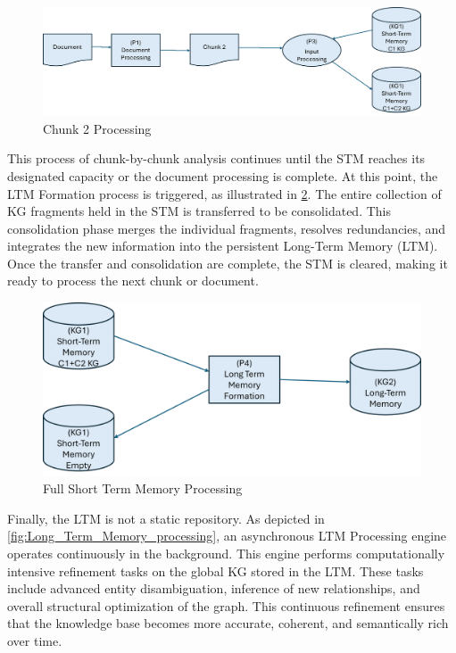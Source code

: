 \begin{figure}[htp]
    \centering
    \includegraphics[width=\linewidth]{figures/chap3_fig/Chunk 2 Processing.png}
    \caption{Chunk 2 Processing}
    \label{fig:chunk_2_processing}
\end{figure}

This process of chunk-by-chunk analysis continues until the STM reaches its designated capacity or the document processing is complete. At this point, the LTM Formation process is triggered, as illustrated in \cref{fig:Full_STM_processing}. The entire collection of KG fragments held in the STM is transferred to be consolidated. This consolidation phase merges the individual fragments, resolves redundancies, and integrates the new information into the persistent Long-Term Memory (LTM). Once the transfer and consolidation are complete, the STM is cleared, making it ready to process the next chunk or document.

\begin{figure}[htp]
    \centering
    \includegraphics[width=\linewidth]{figures/chap3_fig/Full Short Term Memory.png}
    \caption{Full Short Term Memory Processing}
    \label{fig:Full_STM_processing}
\end{figure}

Finally, the LTM is not a static repository. As depicted in \cref{fig:Long_Term_Memory_processing}, an asynchronous LTM Processing engine operates continuously in the background. This engine performs computationally intensive refinement tasks on the global KG stored in the LTM. These tasks include advanced entity disambiguation, inference of new relationships, and overall structural optimization of the graph. This continuous refinement ensures that the knowledge base becomes more accurate, coherent, and semantically rich over time.


